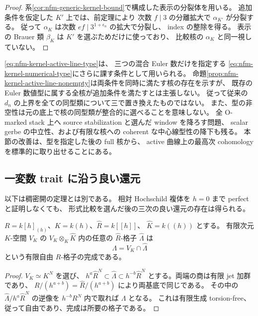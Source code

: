 \begin{proof}
系\ref{cor:nfm-generic-kernel-bound}で構成した表示の分裂体を用いる。
追加条件を仮定した $K'$ 上では、前定理により
次数 $f\mid3$ の分離拡大で $\alpha_{K'}$ が分裂する。
従って $\alpha_K$ は次数 $ef\mid3^{1+\epsilon_n}$ の拡大で分裂し、
index の整除を得る。
表示の Brauer 類 $\beta_K$ は $K'$ を選ぶためだけに使っており、
比較核の $\alpha_K$ と同一視していない。
\end{proof}

\begin{remark}[上界の適用範囲]
\eqref{eq:nfm-kernel-active-line-type}は、
三つの混合 Euler 数だけを指定する
\eqref{eq:nfm-kernel-numerical-type}にさらに課す条件として用いられる。
命題\ref{prop:nfm-kernel-active-line-nonempty}は両条件を同時に満たす核の存在を示すが、
既存の Euler 数値型に属する全核が追加条件を満たすとは主張しない。
従って従来の $d_n$ の上界を全ての同型類について三で置き換えたものではない。
また、型の非空性は元の底上で核の同型類が整合的に選べることを意味しない。
全 O-marked stack 上へ source stabilization と選んだ window を降ろす問題、
scalar gerbe の中立性、および有限な核への coherent な中心線型性の降下も残る。
本節の改善は、型を指定した後の full 核から、
active 曲線上の最高次 cohomology を標準的に取り出せることにある。
\end{remark}


\subsection{一変数 trait に沿う良い還元}

以下は稠密開の定理とは別である。
相対 Hochschild 複体を $h=0$ まで perfect と証明しなくても、
形式比較を選んだ後の三次の良い還元の存在は得られる。

\begin{lemma}[完成上の格子の代数的降下]
\label{lem:nfm-completed-lattice-descent}
$R=k[h]_{(h)}$、$K=k(h)$、$\widehat R=k[[h]]$、
$\widehat K=k((h))$ とする。
有限次元 $K$-空間 $V_K$ の
$V_K\otimes_K\widehat K$ 内の任意の $\widehat R$-格子 $\widehat\Lambda$ は
\[
 \Lambda=V_K\cap\widehat\Lambda
\]
という有限自由 $R$-格子の完成である。
\end{lemma}
\begin{proof}
$V_K\simeq K^N$ を選び、
$h^a\widehat R^N\subset\widehat\Lambda\subset h^{-b}\widehat R^N$
とする。両端の商は有限 jet 加群であり、
$R/(h^{a+b})=\widehat R/(h^{a+b})$ により両基底で同じである。
その中の $\widehat\Lambda/h^a\widehat R^N$ の逆像を
$h^{-b}R^N$ 内で取れば $\Lambda$ となる。
これは有限生成 torsion-free、従って自由であり、完成は所要の格子である。
\end{proof}

